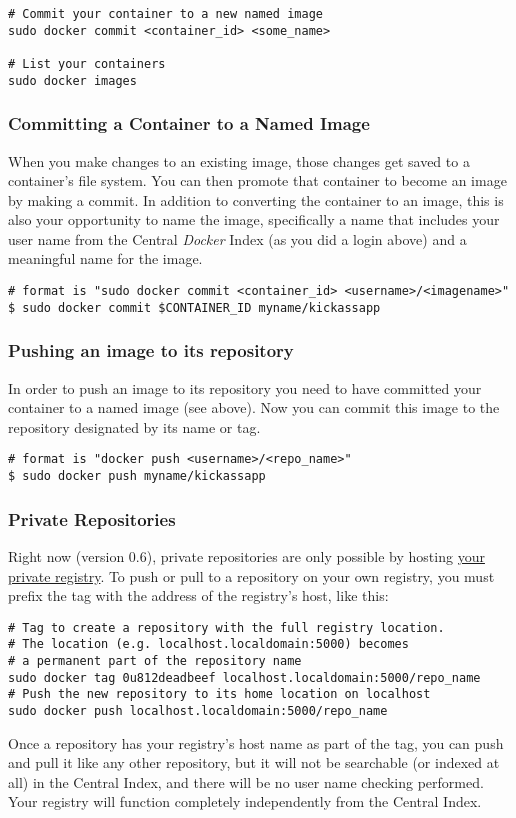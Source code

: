 \documentclass[11pt]{article}
\begin{document}
\begin{verbatim}
# Commit your container to a new named image
sudo docker commit <container_id> <some_name>

# List your containers
sudo docker images
\end{verbatim}
\subsubsection{Committing a Container to a Named Image}
\label{sec-2-3-8}

When you make changes to an existing image, those changes get saved to a container’s file system. You can then promote that container to become an image by making a commit. In addition to converting the container to an image, this is also your opportunity to name the image, specifically a name that includes your user name from the Central \emph{Docker} Index (as you did a login above) and a meaningful name for the image.

\begin{verbatim}
# format is "sudo docker commit <container_id> <username>/<imagename>"
$ sudo docker commit $CONTAINER_ID myname/kickassapp
\end{verbatim}
\subsubsection{Pushing an image to its repository}
\label{sec-2-3-9}

In order to push an image to its repository you need to have committed your container to a named image (see above).
Now you can commit this image to the repository designated by its name or tag.

\begin{verbatim}
# format is "docker push <username>/<repo_name>"
$ sudo docker push myname/kickassapp
\end{verbatim}
\subsubsection{Private Repositories}
\label{sec-2-3-10}

Right now (version 0.6), private repositories are only possible by hosting \href{https://github.com/dotcloud/docker-registry}{your private registry}. To push or pull to a repository on your own registry, you must prefix the tag with the address of the registry’s host, like this:

\begin{verbatim}
# Tag to create a repository with the full registry location.
# The location (e.g. localhost.localdomain:5000) becomes
# a permanent part of the repository name
sudo docker tag 0u812deadbeef localhost.localdomain:5000/repo_name
# Push the new repository to its home location on localhost
sudo docker push localhost.localdomain:5000/repo_name
\end{verbatim}
Once a repository has your registry’s host name as part of the tag, you can push and pull it like any other repository, but it will not be searchable (or indexed at all) in the Central Index, and there will be no user name checking performed. Your registry will function completely independently from the Central Index.
\end{document}
